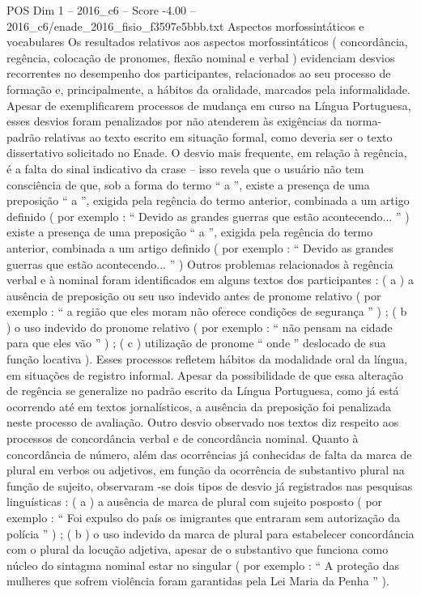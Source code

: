 \begin{textsample}{POS Dim 1 – 2016\_c6 – Score -4.00 – 2016\_c6/enade\_2016\_fisio\_f3597e5bbb.txt}
Aspectos morfossintáticos e vocabulares Os resultados relativos aos aspectos morfossintáticos ( concordância, regência, colocação de pronomes, flexão nominal e verbal ) evidenciam desvios recorrentes no desempenho dos participantes, relacionados ao seu processo de formação e, principalmente, a hábitos da oralidade, marcados pela informalidade.
Apesar de exemplificarem processos de mudança em curso na Língua Portuguesa, esses desvios foram penalizados por não atenderem às exigências da norma-padrão relativas ao texto escrito em situação formal, como deveria ser o texto dissertativo solicitado no Enade.
O desvio mais frequente, em relação à regência, é a falta do sinal indicativo da crase – isso revela que o usuário não tem consciência de que, sob a forma do termo “ a ”, existe a presença de uma preposição “ a ”, exigida pela regência do termo anterior, combinada a um artigo definido ( por exemplo : “ Devido as grandes guerras que estão acontecendo... ” ) existe a presença de uma preposição “ a ”, exigida pela regência do termo anterior, combinada a um artigo definido ( por exemplo : “ Devido as grandes guerras que estão acontecendo... ” ) Outros problemas relacionados à regência verbal e à nominal foram identificados em alguns textos dos participantes : ( a ) a ausência de preposição ou seu uso indevido antes de pronome relativo ( por exemplo : “ a região que eles moram não oferece condições de segurança ” ) ; ( b ) o uso indevido do pronome relativo ( por exemplo : “ não pensam na cidade para que eles vão ” ) ; ( c ) utilização de pronome “ onde ” deslocado de sua função locativa ).
Esses processos refletem hábitos da modalidade oral da língua, em situações de registro informal.
Apesar da possibilidade de que essa alteração de regência se generalize no padrão escrito da Língua Portuguesa, como já está ocorrendo até em textos jornalísticos, a ausência da preposição foi penalizada neste processo de avaliação.
Outro desvio observado nos textos diz respeito aos processos de concordância verbal e de concordância nominal.
Quanto à concordância de número, além das ocorrências já conhecidas de falta da marca de plural em verbos ou adjetivos, em função da ocorrência de substantivo plural na função de sujeito, observaram -se dois tipos de desvio já registrados nas pesquisas linguísticas : ( a ) a ausência de marca de plural com sujeito posposto ( por exemplo : “ Foi expulso do país os imigrantes que entraram sem autorização da polícia ” ) ; ( b ) o uso indevido da marca de plural para estabelecer concordância com o plural da locução adjetiva, apesar de o substantivo que funciona como núcleo do sintagma nominal estar no singular ( por exemplo : “ A proteção das mulheres que sofrem violência foram garantidas pela Lei Maria da Penha ” ).

\end{textsample}
